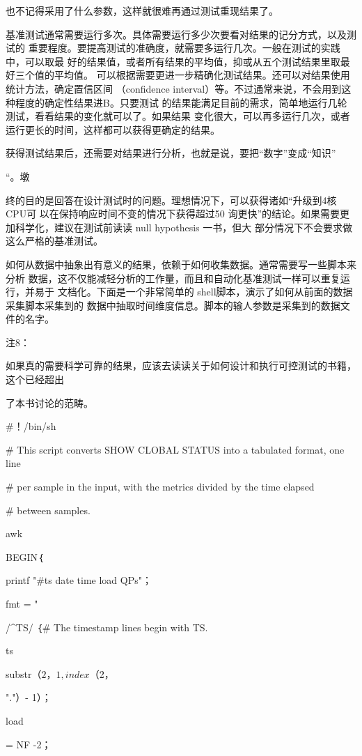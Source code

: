 也不记得采用了什么参数，这样就很难再通过测试重现结果了。

基准测试通常需要运行多次。具体需要运行多少次要看对结果的记分方式，以及测试的
重要程度。要提高测试的准确度，就需要多运行几次。一般在测试的实践中，可以取最
好的结果值，或者所有结果的平均值，抑或从五个测试结果里取最好三个值的平均值。
可以根据需要更进一步精确化测试结果。还可以对结果使用统计方法，确定置信区间
（confidence interval）等。不过通常来说，不会用到这种程度的确定性结果进B。只要测试
的结果能满足目前的需求，简单地运行几轮测试，看看结果的变化就可以了。如果结果
变化很大，可以再多运行几次，或者运行更长的时间，这样都可以获得更确定的结果。

获得测试结果后，还需要对结果进行分析，也就是说，要把“数字”变成“知识”

“。墩

终的目的是回答在设计测试时的问题。理想情况下，可以获得诸如“升级到4核CPU可
以在保持响应时间不变的情况下获得超过50%
询更快”的结论。如果需要更加科学化，建议在测试前读读 null hypothesis 一书，但大
部分情况下不会要求做这么严格的基准测试。

如何从数据中抽象出有意义的结果，依赖于如何收集数据。通常需要写一些脚本来分析
数据，这不仅能减轻分析的工作量，而且和自动化基准测试一样可以重复运行，并易于
文档化。下面是一个非常简单的 shell脚本，演示了如何从前面的数据采集脚本采集到的
数据中抽取时间维度信息。脚本的输人参数是采集到的数据文件的名字。

注8：

如果真的需要科学可靠的结果，应该去读读关于如何设计和执行可控测试的书籍，这个已经超出

了本书讨论的范畴。

#！/bin/sh

# This script converts SHOW CLOBAL STATUS into a tabulated format, one line

# per sample in the input, with the metrics divided by the time elapsed

# between samples.

awk

BEGIN｛

printf "#ts date time load QPs"；

fmt = " %

/^TS/ ｛# The timestamp lines begin with TS.

ts

substr（$2，1, index（$2，

"."）- 1）；

load

= NF -2；

